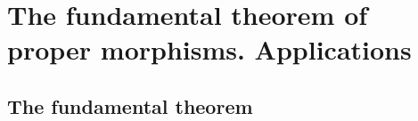 \section{The fundamental theorem of proper morphisms. Applications}
\label{section:3.4}


\subsection{The fundamental theorem}
\label{subsection:3.4.1}














